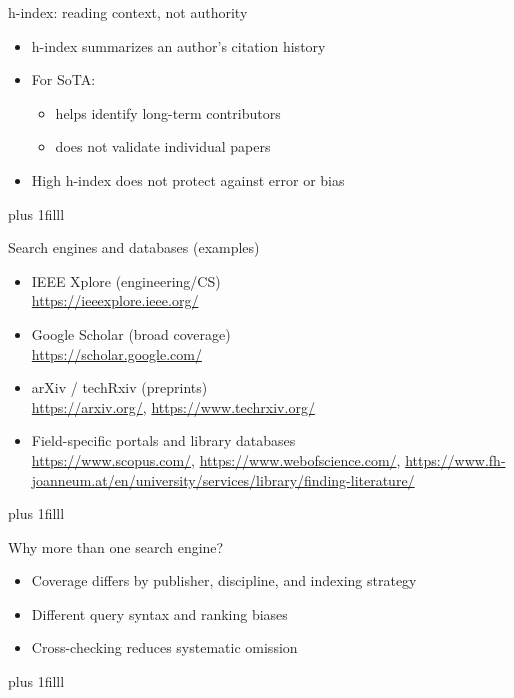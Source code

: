\documentclass[aspectratio=169]{beamer}
\newcommand{\btVFill}{\vskip0pt plus 1filll}
\newcommand{\Activity}[1]{\textbf{Activity:} #1}
\begin{document}
\begin{frame}{h-index: reading context, not authority}
  \begin{itemize}
    \item h-index summarizes an author's citation history
    \item For SoTA:
      \begin{itemize}
        \item helps identify long-term contributors
        \item does not validate individual papers
      \end{itemize}
    \item High h-index does not protect against error or bias
  \end{itemize}
\btVFill
\end{frame}


\begin{frame}{Search engines and databases (examples)}
  \begin{itemize}
    \item IEEE Xplore (engineering/CS)\\
    \url{https://ieeexplore.ieee.org/}
    \item Google Scholar (broad coverage)\\
    \url{https://scholar.google.com/}
    \item arXiv / techRxiv (preprints)\\
    \url{https://arxiv.org/}, \url{https://www.techrxiv.org/}
    \item Field-specific portals and library databases\\
    \url{https://www.scopus.com/}, \url{https://www.webofscience.com/}, \url{https://www.fh-joanneum.at/en/university/services/library/finding-literature/}
  \end{itemize}
  \btVFill
\end{frame}

\begin{frame}{Why more than one search engine?}
  \begin{itemize}
    \item Coverage differs by publisher, discipline, and indexing strategy
    \item Different query syntax and ranking biases
    \item Cross-checking reduces systematic omission
  \end{itemize}
  \btVFill
\end{frame}
\end{document}
